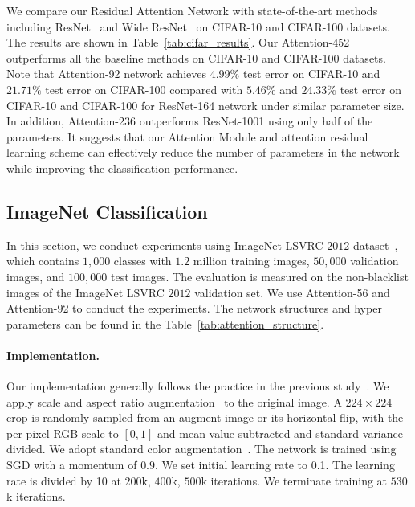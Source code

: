 \documentclass[10pt,twocolumn,letterpaper]{article}
\begin{document}
We compare our Residual Attention Network with state-of-the-art methods including ResNet~\cite{he2016identity} and Wide ResNet~\cite{zagoruyko2016wide} on CIFAR-10 and CIFAR-100 datasets.
%
The results are shown in Table~\ref{tab:cifar_results}.
%
Our Attention-452 outperforms all the baseline methods on CIFAR-10 and CIFAR-100 datasets.
%
Note that Attention-92 network achieves $4.99\%$ test error on CIFAR-10 and $21.71\%$ test error on CIFAR-100 compared with $5.46\%$ and $24.33\%$ test error on CIFAR-10 and CIFAR-100 for ResNet-164 network under similar parameter size.
%
In addition, Attention-236 outperforms ResNet-1001 using only half of the parameters. It suggests that our Attention Module and attention residual learning scheme can effectively reduce the number of parameters in the network while improving the classification performance.
%


\subsection{ImageNet Classification}

In this section, we conduct experiments using ImageNet LSVRC $2012$ dataset~\cite{deng2009imagenet}, which contains $1,000$ classes with $1.2$ million training images, $50,000$ validation images, and $100,000$ test images.
%
The evaluation is measured on the non-blacklist images of the ImageNet LSVRC $2012$ validation set.
%
We use Attention-56 and Attention-92 to conduct the experiments. The network structures and hyper parameters can be found in the Table~\ref{tab:attention_structure}.
%

\paragraph{Implementation.}
Our implementation generally follows the practice in the previous study~\cite{krizhevsky2012imagenet}.
%
We apply scale and aspect ratio augmentation~\cite{szegedy2015going} to the original image.
%
A $224\times 224$ crop is randomly sampled from an augment image or its horizontal flip, with the per-pixel RGB scale to $[0,1]$ and mean value subtracted and standard variance divided. We adopt standard color augmentation~\cite{krizhevsky2012imagenet}.
%
The network is trained using SGD with a momentum of $0.9$.
%
We set initial learning rate to 0.1. The learning rate is divided by 10 at $200$k, $400$k, $500$k iterations. We terminate training at $530$k iterations.
\end{document}
